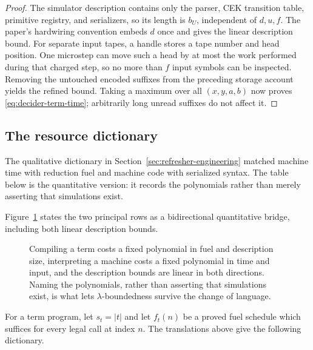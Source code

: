 \begin{proof}
The simulator description contains only the parser, CEK transition table,
primitive registry, and serializers, so its length is \(b_U\), independent of
\(d,u,f\).  The paper's hardwiring convention embeds \(d\) once and gives the
linear description bound.  For separate input tapes, a handle stores a tape
number and head position.  One microstep can move such a head by at most the
work performed during that charged step, so no more than \(f\) input symbols
can be inspected.  Removing the untouched encoded suffixes from the preceding
storage account yields the refined bound.  Taking a maximum over all
\((x,y,a,b)\) now proves \eqref{eq:decider-term-time}; arbitrarily long unread
suffixes do not affect it.
\end{proof}

\subsection{The resource dictionary}

\begin{reminder}
The qualitative dictionary in Section~\ref{sec:refresher-engineering} matched
machine time with reduction fuel and machine code with serialized syntax.  The
table below is the quantitative version: it records the polynomials rather
than merely asserting that simulations exist.
\end{reminder}

Figure~\ref{fig:resource-dictionary} states the two principal rows as a
bidirectional quantitative bridge, including both linear description bounds.
\begin{figure}[H]
\centering

\caption{Compiling a term costs a fixed polynomial in fuel and description size, interpreting a machine costs a fixed polynomial in time and input, and the description bounds are linear in both directions.  Naming the polynomials, rather than asserting that simulations exist, is what lets \(\lambda\)-boundedness survive the change of language.}
\label{fig:resource-dictionary}
\end{figure}

For a term program, let \(s_t=|t|\) and let \(f_t(n)\) be a proved fuel
schedule which suffices for every legal call at index \(n\).  The translations
above give the following dictionary.

